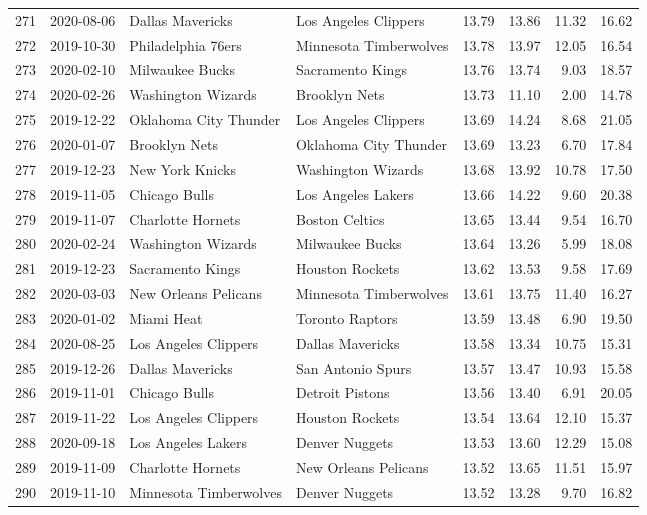 \documentclass[
  11pt,
]{article}
\theoremstyle{nonumberplain}
\begin{document}
\begin{longtable}{rl|llr|rrr}
271 & 2020-08-06 & Dallas Mavericks & Los Angeles Clippers & 13.79 & 13.86 & 11.32 & 16.62\\
272 & 2019-10-30 & Philadelphia 76ers & Minnesota Timberwolves & 13.78 & 13.97 & 12.05 & 16.54\\
273 & 2020-02-10 & Milwaukee Bucks & Sacramento Kings & 13.76 & 13.74 & 9.03 & 18.57\\
274 & 2020-02-26 & Washington Wizards & Brooklyn Nets & 13.73 & 11.10 & 2.00 & 14.78\\
275 & 2019-12-22 & Oklahoma City Thunder & Los Angeles Clippers & 13.69 & 14.24 & 8.68 & 21.05\\
276 & 2020-01-07 & Brooklyn Nets & Oklahoma City Thunder & 13.69 & 13.23 & 6.70 & 17.84\\
277 & 2019-12-23 & New York Knicks & Washington Wizards & 13.68 & 13.92 & 10.78 & 17.50\\
278 & 2019-11-05 & Chicago Bulls & Los Angeles Lakers & 13.66 & 14.22 & 9.60 & 20.38\\
279 & 2019-11-07 & Charlotte Hornets & Boston Celtics & 13.65 & 13.44 & 9.54 & 16.70\\
280 & 2020-02-24 & Washington Wizards & Milwaukee Bucks & 13.64 & 13.26 & 5.99 & 18.08\\
281 & 2019-12-23 & Sacramento Kings & Houston Rockets & 13.62 & 13.53 & 9.58 & 17.69\\
282 & 2020-03-03 & New Orleans Pelicans & Minnesota Timberwolves & 13.61 & 13.75 & 11.40 & 16.27\\
283 & 2020-01-02 & Miami Heat & Toronto Raptors & 13.59 & 13.48 & 6.90 & 19.50\\
284 & 2020-08-25 & Los Angeles Clippers & Dallas Mavericks & 13.58 & 13.34 & 10.75 & 15.31\\
285 & 2019-12-26 & Dallas Mavericks & San Antonio Spurs & 13.57 & 13.47 & 10.93 & 15.58\\
286 & 2019-11-01 & Chicago Bulls & Detroit Pistons & 13.56 & 13.40 & 6.91 & 20.05\\
287 & 2019-11-22 & Los Angeles Clippers & Houston Rockets & 13.54 & 13.64 & 12.10 & 15.37\\
288 & 2020-09-18 & Los Angeles Lakers & Denver Nuggets & 13.53 & 13.60 & 12.29 & 15.08\\
289 & 2019-11-09 & Charlotte Hornets & New Orleans Pelicans & 13.52 & 13.65 & 11.51 & 15.97\\
290 & 2019-11-10 & Minnesota Timberwolves & Denver Nuggets & 13.52 & 13.28 & 9.70 & 16.82\\

\end{longtable}
\end{document}
